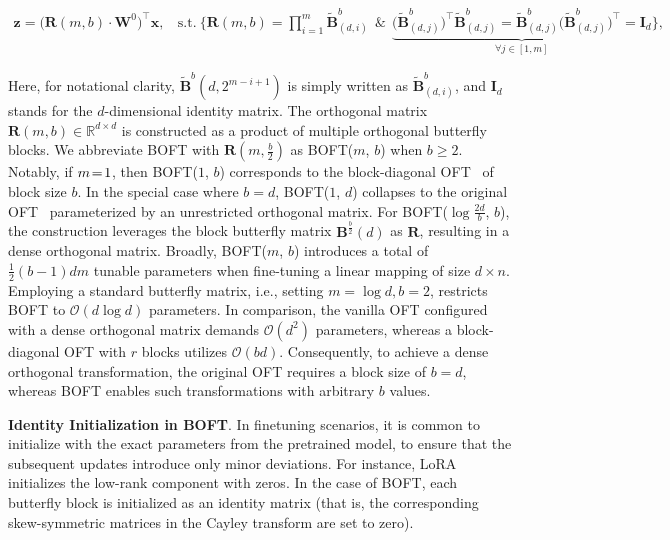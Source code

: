 \begin{equation}
    \begin{aligned}\nonumber
    \bm{z} = \big(\bm{R}(m, b)\cdot \bm{W}^0\big)^\top \bm{x}, ~~~~ \text{s.t.}~ \bigg\{\bm{R}(m, b) = \prod_{i=1}^m \tilde{\bm{B}}^b_{(d,i)} ~~\&~~ \underbrace{\big(\tilde{\bm{B}}^b_{(d,j)}\big)^\top \tilde{\bm{B}}^b_{(d,j)} = \tilde{\bm{B}}^b_{(d,j)} \big(\tilde{\bm{B}}^b_{(d,j)}\big)^\top \!= \bm{I}_d}_{\forall j \in [1, m]}\bigg\},
    \end{aligned}
\end{equation}

Here, for notational clarity, $\tilde{\bm{B}}^b(d, 2^{m-i+1})$ is simply written as $\tilde{\bm{B}}^b_{(d,i)}$, and $\bm{I}_d$ stands for the $d$-dimensional identity matrix. The orthogonal matrix $\bm{R}(m, b) \in \mathbb{R}^{d \times d}$ is constructed as a product of multiple orthogonal butterfly blocks. We abbreviate BOFT with $\bm{R}(m, \frac{b}{2})$ as BOFT($m$, $b$) when $b \geq 2$. Notably, if $\thickmuskip=2mu \medmuskip=2mu m=1$, then BOFT($1$, $b$) corresponds to the block-diagonal OFT~\cite{qiu2023controlling} of block size $b$. In the special case where $b=d$, BOFT($1$, $d$) collapses to the original OFT~\cite{qiu2023controlling} parameterized by an unrestricted orthogonal matrix. For BOFT($\log \frac{2d}{b}$, $b$), the construction leverages the block butterfly matrix $\bm{B}^{\frac{b}{2}}(d)$ as $\bm{R}$, resulting in a dense orthogonal matrix. Broadly, BOFT($m$, $b$) introduces a total of $\frac{1}{2}(b-1)dm$ tunable parameters when fine-tuning a linear mapping of size $d \times n$. Employing a standard butterfly matrix, i.e., setting $m = \log d, b = 2$, restricts BOFT to $\mathcal{O}(d \log d)$ parameters. In comparison, the vanilla OFT configured with a dense orthogonal matrix demands $\mathcal{O}(d^2)$ parameters, whereas a block-diagonal OFT with $r$ blocks utilizes $\mathcal{O}(bd)$. Consequently, to achieve a dense orthogonal transformation, the original OFT requires a block size of $b = d$, whereas BOFT enables such transformations with arbitrary $b$ values.

\textbf{Identity Initialization in BOFT}. In finetuning scenarios, it is common to initialize with the exact parameters from the pretrained model, to ensure that the subsequent updates introduce only minor deviations. For instance, LoRA initializes the low-rank component with zeros. In the case of BOFT, each butterfly block is initialized as an identity matrix (that is, the corresponding skew-symmetric matrices in the Cayley transform are set to zero).

